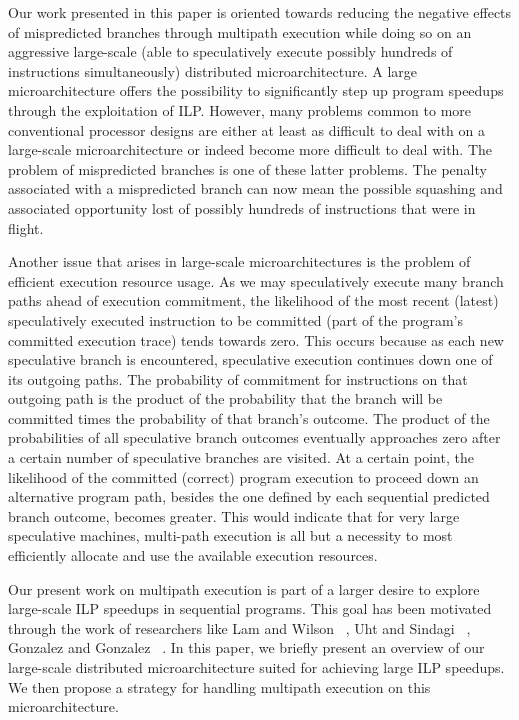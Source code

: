 \documentclass[10pt,dvips]{article}
\begin{document}
Our work presented in this paper is oriented towards reducing the
negative effects of mispredicted branches through multipath execution
while doing so on an aggressive large-scale (able to speculatively execute
possibly hundreds of instructions simultaneously)
distributed
microarchitecture.  
A large microarchitecture offers the
possibility to significantly step up program speedups through 
the exploitation of ILP.
However, many problems common to more conventional processor designs
are either at least as difficult to deal with on a large-scale
microarchitecture or indeed become more difficult to deal with.
The problem of mispredicted branches is one of these latter problems.
The penalty associated with a mispredicted branch can now mean
the possible squashing and associated opportunity lost of possibly
hundreds of instructions that were in flight.  

Another issue that arises in large-scale microarchitectures is the
problem of efficient execution resource usage.
As we may speculatively execute many branch paths ahead of execution
commitment, the likelihood
of the most recent (latest) speculatively executed instruction to
be committed (part of the program's committed execution trace) tends
towards zero.  This occurs because as each new speculative branch is
encountered, speculative execution continues down one of its
outgoing paths.  The probability of commitment for instructions on 
that outgoing
path is the product of the probability that
the branch will be committed times the probability of that branch's outcome.
The product of the probabilities of all speculative branch outcomes
eventually approaches zero after a certain
number of speculative branches are visited. 
At a certain point, the likelihood of the committed (correct)
program execution to proceed down an alternative program path,
besides the one defined by each sequential predicted branch outcome,
becomes greater.  This would indicate that for very large speculative
machines, multi-path execution is all but a necessity to most
efficiently allocate and use the available execution resources.

Our present work on multipath execution is part of a larger
desire to explore large-scale ILP speedups in sequential programs.
This goal has been motivated through the work of researchers like
Lam and Wilson ~\cite{Lam92},
Uht and Sindagi ~\cite{Uht95},
Gonzalez and Gonzalez ~\cite{Gon97}.
In this paper, we briefly present an overview of our large-scale distributed
microarchitecture suited for achieving large ILP speedups.  
We then propose a strategy for handling
multipath execution on this microarchitecture.
\end{document}

